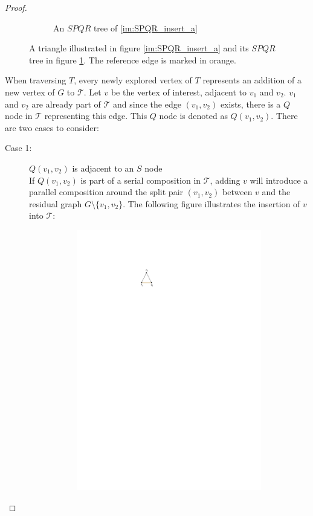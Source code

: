 \begin{proof}
\begin{figure}[H]
\begin{subfigure}{0.4\textwidth}
			\caption{An $SPQR$ tree of \ref{im:SPQR_insert_a}}\label{im:SPQR_insert_b}
		\end{subfigure}
		\caption{A triangle illustrated in figure \ref{im:SPQR_insert_a} and its $SPQR$ tree in figure \ref{im:SPQR_insert_b}. The reference edge is marked in orange.}\label{im:SPQR_insert_1}
	\end{figure}
	When traversing $T$, every newly explored vertex of $T$ represents an addition of a new vertex of $G$ to $\mathcal{T}$. Let $v$ be the vertex of interest, adjacent to $v_1$ and $v_2$. $v_1$ and $v_2$ are already part of $\mathcal{T}$ and since the edge $(v_1,v_2)$ exists, there is a $Q$ node in $\mathcal{T}$ representing this edge. This $Q$ node is denoted as $Q(v_1,v_2)$. There are two cases to consider:
	\begin{description}
		\item[Case 1:] $Q(v_1,v_2)$ is adjacent to an $S$ node\\
		If $Q(v_1,v_2)$ is part of a serial composition in $\mathcal{T}$, adding $v$ will introduce a parallel composition around the split pair $(v_1,v_2)$ between $v$ and the residual graph $G\setminus\{v_1,v_2\}$. The following figure illustrates the insertion of $v$ into $\mathcal{T}$:
		\begin{figure}[H]
			\begin{subfigure}{\textwidth}
				\centering
				\includegraphics[page=3,width=\linewidth]{graphics/SP_graphs_SPQR_inserting.pdf}

\end{subfigure}
\end{figure}
\end{description}
\end{proof}
